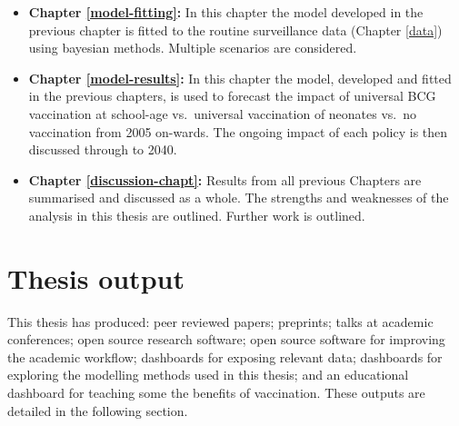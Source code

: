 \documentclass[11pt,twoside]{bristolthesis}
\begin{document}
\begin{itemize}
  \item
    \textbf{Chapter \ref{model-fitting}:} In this chapter the model developed in the previous chapter is fitted to the routine surveillance data (Chapter \ref{data}) using bayesian methods. Multiple scenarios are considered.
  \item
    \textbf{Chapter \ref{model-results}:} In this chapter the model, developed and fitted in the previous chapters, is used to forecast the impact of universal BCG vaccination at school-age vs.~universal vaccination of neonates vs.~no vaccination from 2005 on-wards. The ongoing impact of each policy is then discussed through to 2040.
  \item
    \textbf{Chapter \ref{discussion-chapt}:} Results from all previous Chapters are summarised and discussed as a whole. The strengths and weaknesses of the analysis in this thesis are outlined. Further work is outlined.
  \end{itemize}
  \hypertarget{thesis-output}{%
  \section{Thesis output}\label{thesis-output}}
  
  This thesis has produced: peer reviewed papers; preprints; talks at academic conferences; open source research software; open source software for improving the academic workflow; dashboards for exposing relevant data; dashboards for exploring the modelling methods used in this thesis; and an educational dashboard for teaching some the benefits of vaccination. These outputs are detailed in the following section.
  
\end{document}
